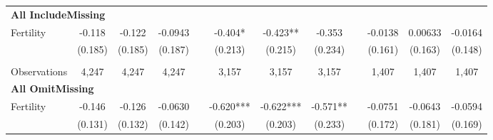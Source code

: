 \begin{landscape}
\begin{table}[htpb!]
\begin{center}
\begin{tabular}{lcccp{2mm}cccp{2mm}ccc}
\multicolumn{12}{l}{\textbf{All IncludeMissing}}\\ 
Fertility&-0.118&-0.122&-0.0943&&-0.404*&-0.423**&-0.353&&-0.0138&0.00633&-0.0164\\
&(0.185)&(0.185)&(0.187)&&(0.213)&(0.215)&(0.234)&&(0.161)&(0.163)&(0.148)\\
\begin{footnotesize}\end{footnotesize}&\begin{footnotesize}\end{footnotesize}&\begin{footnotesize}\end{footnotesize}&\begin{footnotesize}\end{footnotesize}&\begin{footnotesize}\end{footnotesize}&\begin{footnotesize}\end{footnotesize}&\begin{footnotesize}\end{footnotesize}&\begin{footnotesize}\end{footnotesize}&\begin{footnotesize}\end{footnotesize}&\begin{footnotesize}\end{footnotesize}&\begin{footnotesize}\end{footnotesize}&\begin{footnotesize}\end{footnotesize}\\Observations&4,247&4,247&4,247&&3,157&3,157&3,157&&1,407&1,407&1,407\\
\multicolumn{12}{l}{\textbf{All OmitMissing}}\\ 
Fertility&-0.146&-0.126&-0.0630&&-0.620***&-0.622***&-0.571**&&-0.0751&-0.0643&-0.0594\\
&(0.131)&(0.132)&(0.142)&&(0.203)&(0.203)&(0.233)&&(0.172)&(0.181)&(0.169)\\

\end{tabular}
\end{center}
\end{table}
\end{landscape}

